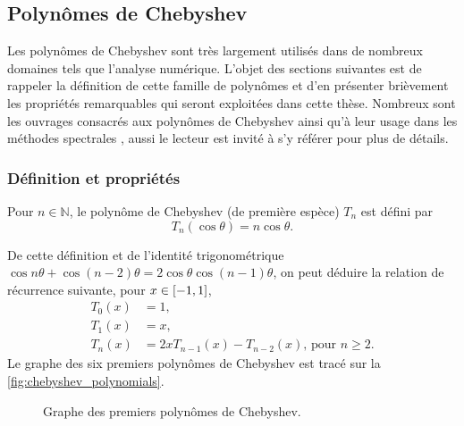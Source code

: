 \subsection{Polynômes de Chebyshev}
Les polynômes de Chebyshev sont très largement utilisés dans de nombreux domaines tels que l'analyse numérique.
L'objet des sections suivantes est de rappeler la définition de cette famille 
de polynômes et d'en présenter brièvement les propriétés remarquables qui seront exploitées dans cette thèse. 
Nombreux sont les ouvrages consacrés aux polynômes de Chebyshev \cite{mason2002, gil2007} ainsi qu'à leur usage dans les méthodes spectrales \cite{boyd2001, canuto2006}, aussi le lecteur est invité à s'y référer pour plus de détails.


\subsubsection{Définition et propriétés}
\begin{definition}
	Pour $n \in \mathbb{N}$, le polynôme de Chebyshev (de première espèce) $T_n$ est défini par%
	\begin{equation}
		T_n(\cos \theta) = n \cos \theta.
		\label{eq:chebyshev_trigo}
	\end{equation}
\end{definition}
De cette définition et de l'identité trigonométrique $\cos n\theta + \cos (n-2)\theta = 2\cos \theta \cos (n-1)\theta$, on peut déduire la relation de récurrence suivante, pour $x \in \left[ -1, 1 \right]$, 
\begin{align}[left = \empheqlbrace\,]
	T_0(x) &= 1, \nonumber\\
	T_1(x) &= x, \nonumber\\
	T_n(x) &= 2x T_{n-1}(x) - T_{n-2}(x) \text{,\ pour\ } n \geq 2.
	\label{eq:chebyshev_recurrence}
\end{align}
Le graphe des six premiers polynômes de Chebyshev est tracé sur la \autoref{fig:chebyshev_polynomials}.\par

\begin{figure}
	\centering
	
	\caption{Graphe des premiers polynômes de Chebyshev.}%
	\label{fig:chebyshev_polynomials}
\end{figure}

